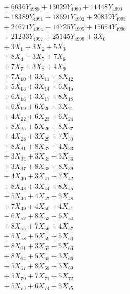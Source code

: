 \documentclass[a4paper,10pt]{article}
\begin{document}
{\begin{align}
&\;  + 6636 Y_{4988} + 13029 Y_{4989} + 11448 Y_{4990} \\[0.3ex]
&\;  + 18389 Y_{4991} + 18691 Y_{4992} + 20839 Y_{4993} \\[0.3ex]
&\;  + 24671 Y_{4994} + 14725 Y_{4995} + 15654 Y_{4996} \\[0.3ex]
&\;  + 21233 Y_{4997} + 25145 Y_{4999} + 3 X_{0} \\[0.3ex]
&\;  + 3 X_{1} + 3 X_{2} + 5 X_{3} \\[0.3ex]
&\;  + 8 X_{4} + 3 X_{5} + 7 X_{6} \\[0.3ex]
&\;  + 7 X_{7} + 3 X_{8} + 4 X_{9} \\[0.5ex]\allowbreak
&\;  + 7 X_{10} + 3 X_{11} + 8 X_{12} \\[0.3ex]
&\;  + 5 X_{13} + 3 X_{14} + 6 X_{15} \\[0.3ex]
&\;  + 6 X_{16} + 3 X_{17} + 8 X_{18} \\[0.3ex]
&\;  + 6 X_{19} + 6 X_{20} + 3 X_{21} \\[0.3ex]
&\;  + 4 X_{22} + 6 X_{23} + 6 X_{24} \\[0.3ex]
&\;  + 8 X_{25} + 5 X_{26} + 8 X_{27} \\[0.3ex]
&\;  + 4 X_{28} + 3 X_{29} + 7 X_{30} \\[0.3ex]
&\;  + 8 X_{31} + 8 X_{32} + 4 X_{33} \\[0.3ex]
&\;  + 3 X_{34} + 3 X_{35} + 3 X_{36} \\[0.3ex]
&\;  + 3 X_{37} + 8 X_{38} + 8 X_{39} \\[0.5ex]\allowbreak
&\;  + 4 X_{40} + 3 X_{41} + 7 X_{42} \\[0.3ex]
&\;  + 8 X_{43} + 3 X_{44} + 8 X_{45} \\[0.3ex]
&\;  + 5 X_{46} + 4 X_{47} + 5 X_{48} \\[0.3ex]
&\;  + 7 X_{49} + 4 X_{50} + 4 X_{51} \\[0.3ex]
&\;  + 6 X_{52} + 8 X_{53} + 6 X_{54} \\[0.3ex]
&\;  + 8 X_{55} + 7 X_{56} + 4 X_{57} \\[0.3ex]
&\;  + 5 X_{58} + 5 X_{59} + 5 X_{60} \\[0.3ex]
&\;  + 8 X_{61} + 3 X_{62} + 5 X_{63} \\[0.3ex]
&\;  + 8 X_{64} + 5 X_{65} + 3 X_{66} \\[0.3ex]
&\;  + 5 X_{67} + 8 X_{68} + 3 X_{69} \\[0.5ex]\allowbreak
&\;  + 5 X_{70} + 7 X_{71} + 5 X_{72} \\[0.3ex]
&\;  + 5 X_{73} + 6 X_{74} + 5 X_{75} \\[0.3ex]

\end{align}}
\end{document}

